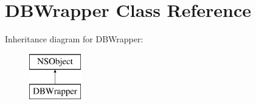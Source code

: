 \hypertarget{interface_d_b_wrapper}{\section{D\-B\-Wrapper Class Reference}
\label{interface_d_b_wrapper}
}
Inheritance diagram for D\-B\-Wrapper\-:\begin{figure}[H]
\begin{center}
\leavevmode
\includegraphics[height=2.000000cm]{interface_d_b_wrapper}
\end{center}
\end{figure}

